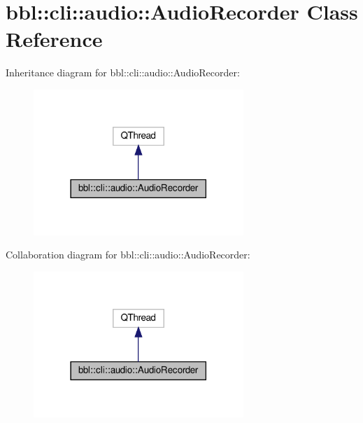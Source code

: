 \hypertarget{classbbl_1_1cli_1_1audio_1_1_audio_recorder}{}\section{bbl\+:\+:cli\+:\+:audio\+:\+:Audio\+Recorder Class Reference}
\label{classbbl_1_1cli_1_1audio_1_1_audio_recorder}


Inheritance diagram for bbl\+:\+:cli\+:\+:audio\+:\+:Audio\+Recorder\+:
\nopagebreak
\begin{figure}[H]
\begin{center}
\leavevmode
\includegraphics[width=225pt]{classbbl_1_1cli_1_1audio_1_1_audio_recorder__inherit__graph}
\end{center}
\end{figure}


Collaboration diagram for bbl\+:\+:cli\+:\+:audio\+:\+:Audio\+Recorder\+:
\nopagebreak
\begin{figure}[H]
\begin{center}
\leavevmode
\includegraphics[width=225pt]{classbbl_1_1cli_1_1audio_1_1_audio_recorder__coll__graph}
\end{center}
\end{figure}
